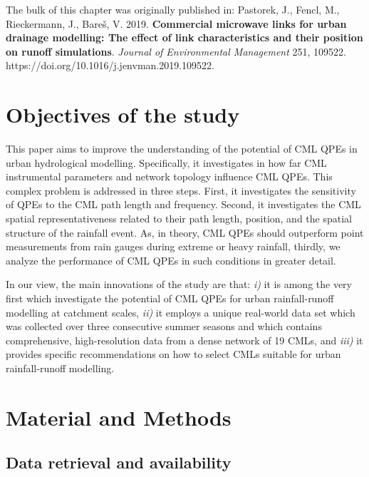 \documentclass{ctuthesis}\usepackage[]{graphicx}\usepackage[]{color}
\begin{document}
{\footnotesize The bulk of this chapter was originally published in: \newline
\-\hspace{0.5cm}
Pastorek, J., Fencl, M., Rieckermann, J., Bareš, V. 2019. \textbf{Commercial microwave links for urban drainage modelling: The effect of link characteristics and their position on runoff simulations}. \emph{Journal of Environmental Management} 251, 109522. \newline https://doi.org/10.1016/j.jenvman.2019.109522.
}

\section{Objectives of the study}

This paper aims to improve the understanding of the potential of CML QPEs in urban hydrological modelling. Specifically, it investigates in how far CML instrumental parameters and network topology influence CML QPEs. This complex problem is addressed in three steps. First, it investigates the sensitivity of QPEs to the CML path length and frequency. Second, it investigates the CML spatial representativeness related to their path length, position, and the spatial structure of the rainfall event. As, in theory, CML QPEs should outperform point measurements from rain gauges during extreme or heavy rainfall, thirdly, we analyze the performance of CML QPEs in such conditions in greater detail. 

In our view, the main innovations of the study are that: \emph{i)} it is among the very first which investigate the potential of CML QPEs for urban rainfall-runoff modelling at catchment scales, \emph{ii)} it employs a unique real-world data set which was collected over three consecutive summer seasons and which contains comprehensive, high-resolution data from a dense network of 19 CMLs, and \emph{iii)} it provides specific recommendations on how to select CMLs suitable for urban rainfall-runoff modelling.

 
\section{Material and Methods} \label{paperIMnM}

\subsection{Data retrieval and availability} \label{DatAva}
\end{document}
